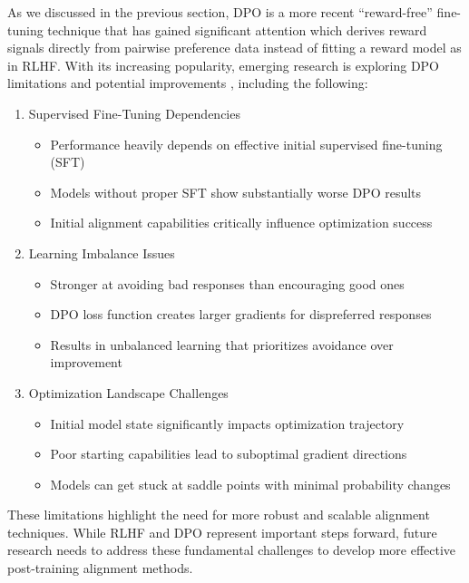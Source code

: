 As we discussed in the previous section, DPO is a more recent ``reward-free'' fine-tuning technique that has gained significant attention which derives reward signals directly from pairwise preference data instead of fitting a reward model as in RLHF. With its increasing popularity, emerging research is exploring DPO limitations and potential improvements , including the following:

\begin{enumerate}
\item Supervised Fine-Tuning Dependencies
\begin{itemize}
\item Performance heavily depends on effective initial supervised fine-tuning (SFT)
\item Models without proper SFT show substantially worse DPO results
\item Initial alignment capabilities critically influence optimization success
\end{itemize}

\item Learning Imbalance Issues
\begin{itemize}
\item Stronger at avoiding bad responses than encouraging good ones
\item DPO loss function creates larger gradients for dispreferred responses
\item Results in unbalanced learning that prioritizes avoidance over improvement
\end{itemize}

\item Optimization Landscape Challenges
\begin{itemize}
\item Initial model state significantly impacts optimization trajectory
\item Poor starting capabilities lead to suboptimal gradient directions
\item Models can get stuck at saddle points with minimal probability changes
\end{itemize}
\end{enumerate}

These limitations highlight the need for more robust and scalable alignment techniques. While RLHF and DPO represent important steps forward, future research needs to address these fundamental challenges to develop more effective post-training alignment methods.

